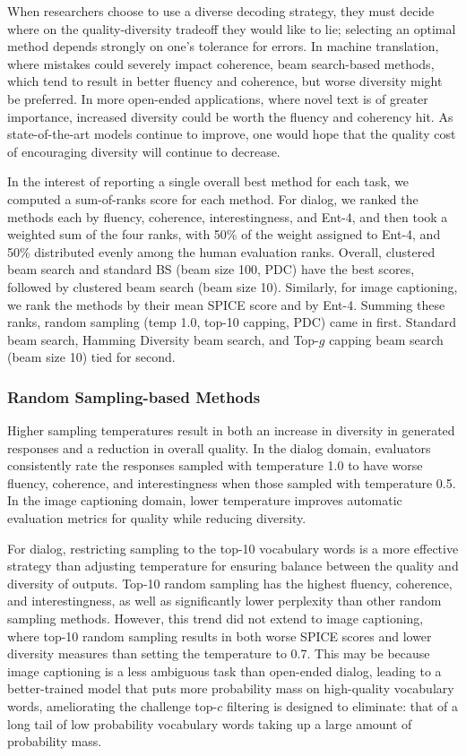 \documentclass[thesis.tex]{subfiles}
\begin{document}
When researchers choose to use a diverse decoding strategy, they must decide where on the quality-diversity tradeoff they would like to lie; selecting an optimal method depends strongly on one's tolerance for errors. In machine translation, where mistakes could severely impact coherence, beam search-based methods, which tend to result in better fluency and coherence, but worse diversity might be preferred. In more open-ended applications, where novel text is of greater importance, increased diversity could be worth the fluency and coherency hit. As state-of-the-art models continue to improve, one would hope that the quality cost of encouraging diversity will continue to decrease. 

In the interest of reporting a single overall best method for each task, we computed a sum-of-ranks score for each method. For dialog, we ranked the methods each by fluency, coherence, interestingness, and Ent-4, and then took a weighted sum of the four ranks, with 50\% of the weight assigned to Ent-4, and 50\% distributed evenly among the human evaluation ranks. Overall, clustered beam search and standard BS (beam size 100, PDC) have the best scores, followed by clustered beam search (beam size 10). Similarly, for image captioning, we rank the methods by their mean SPICE score and by Ent-4. Summing these ranks, random sampling (temp 1.0, top-10 capping, PDC) came in first. Standard beam search, Hamming Diversity beam search, and Top-$g$ capping beam search (beam size 10) tied for second.

\subsubsection{Random Sampling-based Methods}
Higher sampling temperatures result in both an increase in diversity in generated responses and a reduction in overall quality.
In the dialog domain, evaluators consistently rate the responses sampled with temperature 1.0 to have worse fluency, coherence, and interestingness when those sampled with temperature 0.5.
In the image captioning domain, lower temperature improves automatic evaluation metrics for quality while reducing diversity.

For dialog, restricting sampling to the top-10 vocabulary words is a more effective strategy than adjusting temperature for ensuring balance between the quality and diversity of outputs.
Top-10 random sampling has the highest fluency, coherence, and interestingness, as well as significantly lower perplexity than other random sampling methods.
However, this trend did not extend to image captioning, where top-10 random sampling results in both worse SPICE scores and lower diversity measures than setting the temperature to 0.7.
This may be because image captioning is a less ambiguous task than open-ended dialog, leading to a better-trained model that puts more probability mass on high-quality vocabulary words, ameliorating the challenge top-$c$ filtering is designed to eliminate: that of a long tail of low probability vocabulary words taking up a large amount of probability mass.
\end{document}
